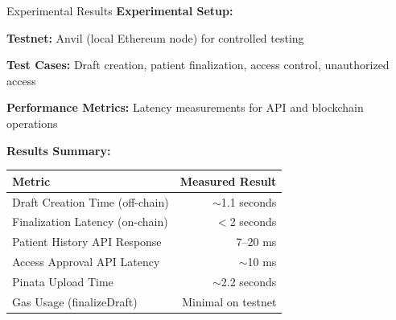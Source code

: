 \documentclass[10pt]{beamer}
\let\olditemize\itemize
\let\endolditemize\enditemize
\renewenvironment{itemize}
  {\olditemize\justifying}
  {\endolditemize}
\begin{document}
\begin{frame}{Experimental Results}
\textbf{Experimental Setup:}
\begin{itemize}
\item \textbf{Testnet:} Anvil (local Ethereum node) for controlled testing
\item \textbf{Test Cases:} Draft creation, patient finalization, access control, unauthorized access
\item \textbf{Performance Metrics:} Latency measurements for API and blockchain operations
\end{itemize}

\vspace{0.3cm}
\textbf{Results Summary:}

\begin{table}[h]
\centering
\footnotesize
\begin{tabular}{@{}lr@{}}
\toprule
\textbf{Metric} & \textbf{Measured Result} \\
\midrule
Draft Creation Time (off-chain) & $\sim$1.1 seconds \\
Finalization Latency (on-chain) & $<$2 seconds \\
Patient History API Response & 7--20 ms \\
Access Approval API Latency & $\sim$10 ms \\
Pinata Upload Time & $\sim$2.2 seconds \\
Gas Usage (finalizeDraft) & Minimal on testnet \\
\bottomrule
\end{tabular}
\end{table}
\end{frame}
\end{document}
